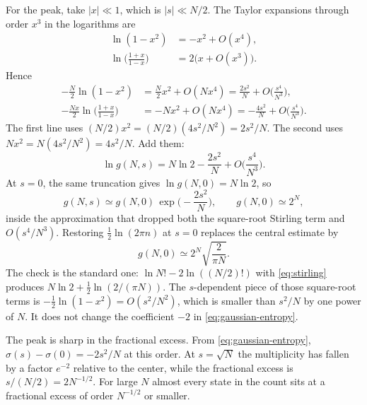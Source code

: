 For the peak, take \(|x|\ll 1\), which is \(|s|\ll N/2\). The Taylor expansions through order \(x^3\) in the logarithms are
\begin{align}
\ln(1-x^2) &= -x^2 + O(x^4), \nonumber\\
\ln\biggl(\frac{1+x}{1-x}\biggr)
&= 2\bigl(x + O(x^3)\bigr).
\label{eq:log-series}
\end{align}
Hence
\begin{align}
-\frac{N}{2}\ln(1-x^2)
&= \frac{N}{2}x^2 + O(N x^4)
= \frac{2s^2}{N} + O\biggl(\frac{s^4}{N^3}\biggr), \nonumber\\
-\frac{Nx}{2}\ln\biggl(\frac{1+x}{1-x}\biggr)
&= -N x^2 + O(N x^4)
= -\frac{4s^2}{N} + O\biggl(\frac{s^4}{N^3}\biggr).
\label{eq:two-contributions}
\end{align}
The first line uses \((N/2)x^2 = (N/2)(4s^2/N^2) = 2s^2/N\). The second uses \(N x^2 = N(4s^2/N^2) = 4s^2/N\). Add them:
\begin{equation}
\label{eq:gaussian-entropy}
\ln g(N,s)
= N\ln 2 - \frac{2s^2}{N} + O\biggl(\frac{s^4}{N^3}\biggr).
\end{equation}
At \(s = 0\), the same truncation gives \(\ln g(N,0) = N\ln 2\), so
\begin{equation}
\label{eq:gaussian-multiplicity}
g(N,s) \simeq g(N,0)\, \exp\biggl(-\frac{2s^2}{N}\biggr),
\qquad
g(N,0) \simeq 2^{N},
\end{equation}
inside the approximation that dropped both the square-root Stirling term and \(O(s^4/N^3)\). Restoring \(\tfrac{1}{2}\ln(2\pi n)\) at \(s=0\) replaces the central estimate by
\begin{equation}
\label{eq:central-prefactor}
g(N,0) \simeq 2^{N}\sqrt{\frac{2}{\pi N}}.
\end{equation}
The check is the standard one: \(\ln N! - 2\ln((N/2)!)\) with \eqref{eq:stirling} produces \(N\ln 2 + \tfrac{1}{2}\ln(2/(\pi N))\). The \(s\)-dependent piece of those square-root terms is \(-\tfrac{1}{2}\ln(1-x^2) = O(s^2/N^2)\), which is smaller than \(s^2/N\) by one power of \(N\). It does not change the coefficient \(-2\) in \eqref{eq:gaussian-entropy}.

The peak is sharp in the fractional excess. From \eqref{eq:gaussian-entropy}, \(\sigma(s)-\sigma(0) = -2s^2/N\) at this order. At \(s = \sqrt{N}\) the multiplicity has fallen by a factor \(e^{-2}\) relative to the center, while the fractional excess is \(s/(N/2) = 2 N^{-1/2}\). For large \(N\) almost every state in the count sits at a fractional excess of order \(N^{-1/2}\) or smaller.

